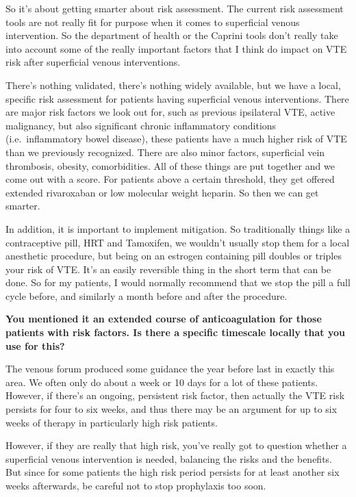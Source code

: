 \documentclass[
]{book}
\begin{document}
So it's about getting smarter about risk assessment. The current risk
assessment tools are not really fit for purpose when it comes to
superficial venous intervention. So the department of health or the
Caprini tools don't really take into account some of the really
important factors that I think do impact on VTE risk after superficial
venous interventions.

There's nothing validated, there's nothing widely available, but we have
a local, specific risk assessment for patients having superficial venous
interventions. There are major risk factors we look out for, such as
previous ipsilateral VTE, active malignancy, but also significant
chronic inflammatory conditions (i.e.~inflammatory bowel disease), these
patients have a much higher risk of VTE than we previously recognized.
There are also minor factors, superficial vein thrombosis, obesity,
comorbidities. All of these things are put together and we come out with
a score. For patients above a certain threshold, they get offered
extended rivaroxaban or low molecular weight heparin. So then we can get
smarter.

In addition, it is important to implement mitigation. So traditionally
things like a contraceptive pill, HRT and Tamoxifen, we wouldn't usually
stop them for a local anesthetic procedure, but being on an estrogen
containing pill doubles or triples your risk of VTE. It's an easily
reversible thing in the short term that can be done. So for my patients,
I would normally recommend that we stop the pill a full cycle before,
and similarly a month before and after the procedure.

\textbf{You mentioned it an extended course of anticoagulation for those
patients with risk factors. Is there a specific timescale locally that
you use for this?}

The venous forum produced some guidance the year before last in exactly
this area. We often only do about a week or 10 days for a lot of these
patients. However, if there's an ongoing, persistent risk factor, then
actually the VTE risk persists for four to six weeks, and thus there may
be an argument for up to six weeks of therapy in particularly high risk
patients.

However, if they are really that high risk, you've really got to
question whether a superficial venous intervention is needed, balancing
the risks and the benefits. But since for some patients the high risk
period persists for at least another six weeks afterwards, be careful
not to stop prophylaxis too soon.
\end{document}
